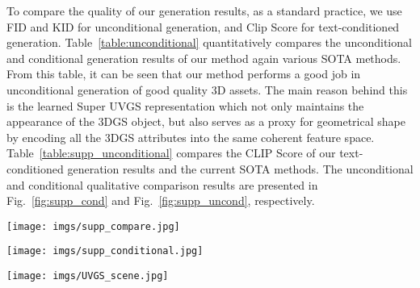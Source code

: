 To compare the quality of our generation results, as a standard practice, we use FID and KID for unconditional generation, and Clip Score for text-conditioned generation. Table~\ref{table:unconditional} quantitatively compares the unconditional and conditional generation results of our method again various SOTA methods. 
From this table, it can be seen that our method performs a good job in unconditional generation of good quality 3D assets. The main reason behind this is the learned Super UVGS representation which not only maintains the appearance of the 3DGS object, but also serves as a proxy for geometrical shape by encoding all the 3DGS attributes into the same coherent feature space. Table~\ref{table:supp_unconditional} compares the CLIP Score of our text-conditioned generation results and the current SOTA methods. The unconditional and conditional qualitative comparison results are presented in Fig.~\ref{fig:supp_cond} and Fig.~\ref{fig:supp_uncond}, respectively.



\begin{figure*}[!ht]
\centering
\texttt{[image: imgs/supp\_compare.jpg]} 
\caption{
Here we show more comparison of unconditional 3D asset generation on the cars category with SOTA methods. Figure shows that DiffTF~\cite{difftf2023} produces low-quality, low-resolution cars lacking detail. 
While Get3D~\cite{get3d2022} achieve higher resolution, it suffers from 3D inconsistency, numerous artifacts, and lack richness in 3D detail. Similar issues are found in GaussianCube~\cite{gaussiancube2024} along with symmetric inconsistency in the results. 
In contrast, our method generates high-quality, high-resolution objects that are 3D consistent with sharp, well-defined edges.
The top three rows show the unconditional generation results of our method using ShapeNet dataset, while the bottom 3 show from Objaverse dataset.
}
\label{fig:supp_uncond}
\end{figure*}




\begin{figure*}[!h]
\centering
\texttt{[image: imgs/supp\_conditional.jpg]} 
\caption{
Text-conditioned generation results on various baselines and the proposed method. Our method not only generates high-quality assets for simpler objects, but also for complicated objects with intricate geometries like \textit{the wheel} or \textit{the airplane}.
}
\label{fig:supp_cond}
\end{figure*}



\begin{figure*}[t]
\centering
\texttt{[image: imgs/UVGS\_scene.jpg]} 
\caption{
To show the effectiveness of proposed UVGS maps in capturing the intricacies of a complex real-world scene, we used a 12 layer UV map to reconstruct the 3D scenes.
}
\label{fig:supp_scene}
\end{figure*}